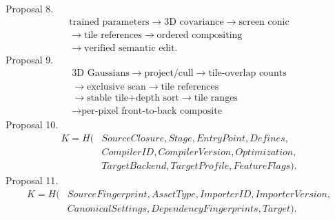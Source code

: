\documentclass[11pt,twoside]{article}
\begin{document}
\clearpage
\noindent Proposal 8.
\[
\begin{gathered}\text{trained parameters}\to\text{3D covariance}\to\text{screen conic}\\\to\text{tile references}\to\text{ordered compositing}\\\to\text{verified semantic edit}.\end{gathered}
\]
\clearpage
\noindent Proposal 9.
\[
\begin{gathered}\text{3D Gaussians}\rightarrow\text{project/cull}\rightarrow\text{tile-overlap counts}\\\rightarrow\text{exclusive scan}\rightarrow\text{tile references}\\\rightarrow\text{stable tile+depth sort}\rightarrow\text{tile ranges}\\\rightarrow\text{per-pixel front-to-back composite}\end{gathered}
\]
\clearpage
\noindent Proposal 10.
\[
\begin{aligned}K=H(&SourceClosure,Stage,EntryPoint,Defines,\\&CompilerID,CompilerVersion,Optimization,\\&TargetBackend,TargetProfile,FeatureFlags).\end{aligned}
\]
\clearpage
\noindent Proposal 11.
\[
\begin{aligned}K=H(&SourceFingerprint,AssetType,ImporterID,ImporterVersion,\\&CanonicalSettings,DependencyFingerprints,Target).\end{aligned}
\]
\clearpage
\end{document}
